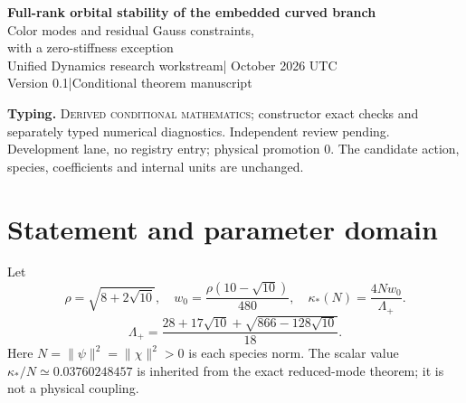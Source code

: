 \documentclass[11pt,a4paper]{article}
\begin{document}
\begin{center}
{\Large\bfseries Full-rank orbital stability of the embedded curved branch}\\[8pt]
{\large Color modes and residual Gauss constraints,\\with a zero-stiffness exception}\\[10pt]
Unified Dynamics research workstream\quad | October 2026 UTC\\
Version 0.1\quad |\quad Conditional theorem manuscript
\end{center}
\begin{abstract}
We extend the scalar negative-holonomy branch to a single active color of the unchanged finite $\mathrm U(r)$ link--matter Hamiltonian. Each additional color has a positive active-to-empty quadratic matter form. Its magnetic Hessian vanishes exactly: within the relevant two-color plane, each Wilson matrix has determinant $-1$ and purely imaginary trace. Gauss reduction gives a positive-mass, positive-stiffness complex oscillator system whose frequencies are independent of the magnetic coefficient. The unused block is a vacuum link system with positive cycle stiffness when $\kappa>0$. A local energy estimate then extends the sharp scalar orbital stability interval, including its quartic endpoint, to full-rank perturbations. For every finite $r\ge2$, the embedded orbit is stable precisely for $0<\kappa\le r\kappa_*(N)$. At zero stiffness an exact unused-color holonomy drift proves instability; above the upper boundary the invariant active scalar subsystem proves instability. The nonfree residual gauge symmetry is retained explicitly. These are conditional mathematical results with no physical promotion.
\end{abstract}
\textbf{Typing.} \textsc{Derived conditional mathematics}; constructor exact checks and separately typed numerical diagnostics. Independent review pending. Development lane, no registry entry; physical promotion $0$. The candidate action, species, coefficients and internal units are unchanged.

\section{Statement and parameter domain}
Let
\[
\rho=\sqrt{8+2\sqrt{10}},\quad w_0=\frac{\rho(10-\sqrt{10})}{480},\quad \kappa_*(N)=\frac{4Nw_0}{\Lambda_+}.
\]\[
\Lambda_+=\frac{28+17\sqrt{10}+\sqrt{866-128\sqrt{10}}}{18}.
\]
Here $N=\|\psi\|^2=\|\chi\|^2>0$ is each species norm. The scalar value $\kappa_*/N\simeq0.03760248457$ is inherited from the exact reduced-mode theorem; it is not a physical coupling.
\end{document}
